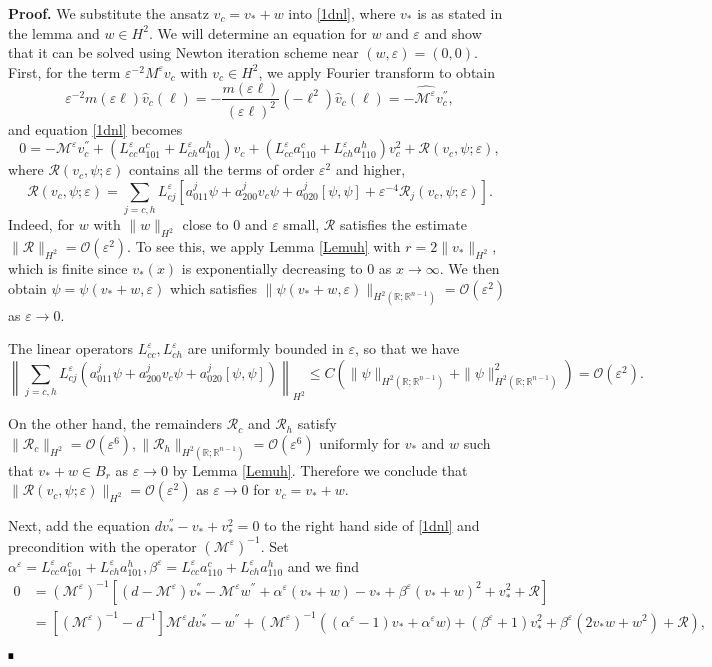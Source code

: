 \documentclass[letterpaper,11pt]{article}
\newcommand{\R}{\mathbb{R}}
\newcommand{\rmO}{\mathcal{O}}
\newcommand{\eps}{\varepsilon}
\newcommand{\Rm}{\mathcal{R}}
\newcommand{\M}{\mathcal{M}}
\numberwithin{equation}{section}
\theoremstyle{plain}
\theoremstyle{remark}
\newenvironment{Proof}[1][.]%
 {\begin{trivlist}\item[]\textbf{Proof#1 }}%
 {\hspace*{\fill}$\rule{0.3\baselineskip}{0.35\baselineskip}$\end{trivlist}}
\begin{document}
\begin{Proof}
We substitute the ansatz $v_c = v_* + w$ into \eqref{1dnl}, where $v_*$ is as stated in the lemma and $w \in H^2$. We will determine an equation for $w$ and $\eps$ and show that it can be solved using Newton iteration scheme near $(w,\eps)=(0,0)$.
First, for the term $\eps^{-2}M^\eps v_c$ with $v_c \in H^2$, we apply Fourier transform to obtain
\[
\eps^{-2}m(\eps\ell)\widehat{v}_c(\ell) = -\frac{m(\eps\ell)}{(\eps\ell)^2}(-\ell^2)\widehat{v}_c(\ell) = \widehat{-\M^\eps v_c^{''}},
\]
and equation \eqref{1dnl} becomes
\[
0 = -\M^\eps v_c^{''} + \left(L_{cc}^\eps a_{101}^c+L_{ch}^\eps a_{101}^h\right)v_c+\left(L_{cc}^\eps a_{110}^c+L_{ch}^\eps a_{110}^h\right)v_c^2 + \Rm(v_c,\psi;\eps),
\]
where $\Rm(v_c,\psi;\eps)$ contains all the terms of order $\eps^2$ and higher,
\[
\Rm(v_c,\psi;\eps) =\sum_{j=c,h} L_{cj}^\eps\left[ a_{011}^j\psi+a_{200}^j v_c\psi+a_{020}^j [\psi,\psi]+\eps^{-4}\Rm_j(v_c,\psi;\eps)\right].
\]
Indeed, for $w$ with $\|w\|_{H^2}$ close to $0$ and $\eps$ small, $\Rm$ satisfies the estimate $\|\Rm\|_{H^2} = \rmO(\eps^2)$.  To see this, we apply Lemma \ref{Lemuh} with $r = 2\|v_*\|_{H^2}$, which is finite since $v_*(x)$ is exponentially decreasing to $0$ as $x\to \infty$.  We then obtain $\psi = \psi(v_*+w,\eps)$ which satisfies $\|\psi(v_*+w,\eps)\|_{H^2(\R;\R^{n-1})} = \rmO(\eps^2)$ as $\eps \to 0$.

The linear operators $L_{cc}^\eps, L_{ch}^\eps$ are uniformly bounded in $\eps$, so that we have
\[
\left\|\sum_{j=c,h} L_{cj}^\eps\left( a_{011}^j\psi+a_{200}^j v_c\psi+a_{020}^j [\psi,\psi]\right)\right\|_{H^2} \le C(\|\psi\|_{H^2(\R;\R^{n-1})}+\|\psi\|_{H^2(\R;\R^{n-1})}^2) = \rmO(\eps^2).
\]

On the other hand, the remainders $\Rm_c$ and $\Rm_h$ satisfy $\|\Rm_c\|_{H^2}= \rmO(\eps^6), \|\Rm_h\|_{H^2(\R;\R^{n-1})} = \rmO(\eps^6)$ uniformly for $v_*$ and $w$ such that $v_* +w \in B_r$ as $\eps \to 0$ by Lemma \ref{Lemuh}. Therefore we conclude that $\|\Rm(v_c,\psi;\eps)\|_{H^2} = \rmO(\eps^2)$ as $\eps \to 0$ for $v_c=v_*+w$.
 
Next, add the equation $dv_*^{''}-v_*+v_*^2 =0$ to the right hand side of \eqref{1dnl} and precondition with the operator $(\M^{\eps})^{-1}$. Set $\alpha^\eps = L_{cc}^\eps a_{101}^c+L_{ch}^\eps a_{101}^h, \beta^\eps=L_{cc}^\eps a_{110}^c+L_{ch}^\eps a_{110}^h$ and we find
\begin{align}
0 &=(\M^\eps)^{-1}\left[ (d-\M^\eps)v_*^{''} -\M^\eps w^{''}+\alpha^\eps(v_*+w)-v_*+\beta^\eps(v_*+w)^2+v_*^2 + \Rm \right] \nonumber\\
&=[(\M^{\eps})^{-1}-d^{-1}]\M^\eps dv_*^{''}-w^{''}+(\M^{\eps})^{-1}\left((\alpha^\eps-1)v_*+\alpha^\eps w)+(\beta^\eps+1)v_*^2+\beta^\eps(2v_*w+w^2) +\Rm\right), \label{splfy nl}
\end{align}



\end{Proof}
\end{document}
